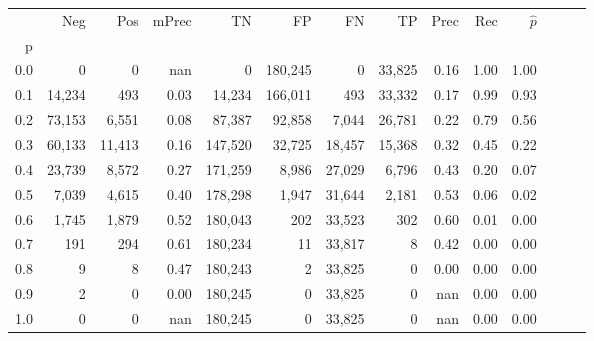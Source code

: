 \begin{tabular}{rrrrrrrrrrrrrr}
\toprule
{} &     Neg &     Pos & mPrec &       TN &       FP &      FN &      TP &  Prec &   Rec & $\hat{p}$ \\
p   &         &         &       &          &          &         &         &       &       &           \\
\midrule
0.0 &       0 &       0 &   nan &        0 &  180,245 &       0 &  33,825 &  0.16 &  1.00 &      1.00 \\
0.1 &  14,234 &     493 &  0.03 &   14,234 &  166,011 &     493 &  33,332 &  0.17 &  0.99 &      0.93 \\
0.2 &  73,153 &   6,551 &  0.08 &   87,387 &   92,858 &   7,044 &  26,781 &  0.22 &  0.79 &      0.56 \\
0.3 &  60,133 &  11,413 &  0.16 &  147,520 &   32,725 &  18,457 &  15,368 &  0.32 &  0.45 &      0.22 \\
0.4 &  23,739 &   8,572 &  0.27 &  171,259 &    8,986 &  27,029 &   6,796 &  0.43 &  0.20 &      0.07 \\
0.5 &   7,039 &   4,615 &  0.40 &  178,298 &    1,947 &  31,644 &   2,181 &  0.53 &  0.06 &      0.02 \\
0.6 &   1,745 &   1,879 &  0.52 &  180,043 &      202 &  33,523 &     302 &  0.60 &  0.01 &      0.00 \\
0.7 &     191 &     294 &  0.61 &  180,234 &       11 &  33,817 &       8 &  0.42 &  0.00 &      0.00 \\
0.8 &       9 &       8 &  0.47 &  180,243 &        2 &  33,825 &       0 &  0.00 &  0.00 &      0.00 \\
0.9 &       2 &       0 &  0.00 &  180,245 &        0 &  33,825 &       0 &   nan &  0.00 &      0.00 \\
1.0 &       0 &       0 &   nan &  180,245 &        0 &  33,825 &       0 &   nan &  0.00 &      0.00 \\
\bottomrule
\end{tabular}
